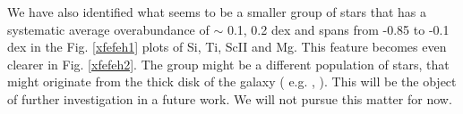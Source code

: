 \documentclass[dvips,12pt,a4paper]{report}
\begin{document}
{{We have also identified what seems to be a smaller group of stars that has a systematic average overabundance of $\sim$ 0.1, 0.2 dex and spans from -0.85 to -0.1 dex in the Fig. \ref{xfefeh1} plots of Si, Ti, ScII and Mg. This feature becomes even clearer in Fig. \ref{xfefeh2}. The group might be a different population of stars, that might originate from the thick disk of the galaxy ( e.g. \citeauthor{Fuhrmann-2004} \citeyear{Fuhrmann-2004}, \citeauthor{Bensby-2003}\citeyear{Bensby-2003}). This will be the object of further investigation in a future work. We will not pursue this matter for now. 














}}
\end{document}
